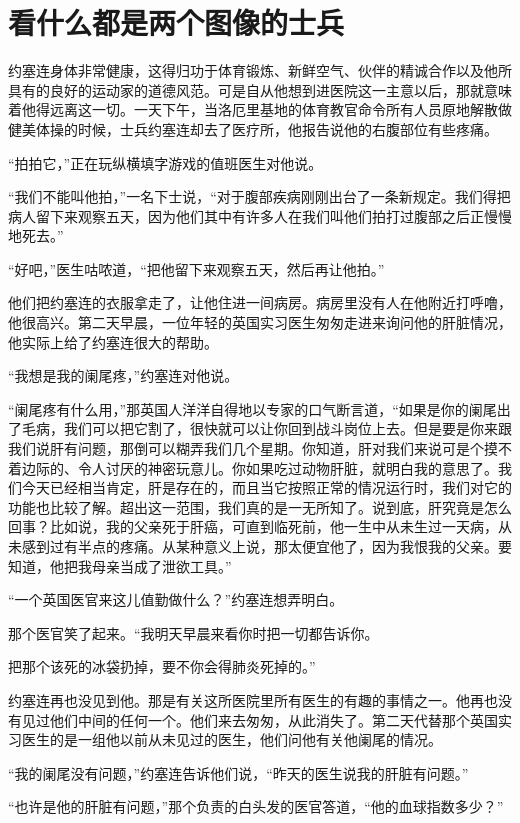 \chapter{看什么都是两个图像的士兵}
 
    约塞连身体非常健康，这得归功于体育锻炼、新鲜空气、伙伴的精诚合作以及他所具有的良好的运动家的道德风范。可是自从他想到进医院这一主意以后，那就意味着他得远离这一切。一天下午，当洛厄里基地的体育教官命令所有人员原地解散做健美体操的时候，士兵约塞连却去了医疗所，他报告说他的右腹部位有些疼痛。

    “拍拍它，”正在玩纵横填字游戏的值班医生对他说。

    “我们不能叫他拍，”一名下士说，“对于腹部疾病刚刚出台了一条新规定。我们得把病人留下来观察五天，因为他们其中有许多人在我们叫他们拍打过腹部之后正慢慢地死去。”

    “好吧，”医生咕哝道，“把他留下来观察五天，然后再让他拍。”

    他们把约塞连的衣服拿走了，让他住进一间病房。病房里没有人在他附近打呼噜，他很高兴。第二天早晨，一位年轻的英国实习医生匆匆走进来询问他的肝脏情况，他实际上给了约塞连很大的帮助。

    “我想是我的阑尾疼，”约塞连对他说。

    “阑尾疼有什么用，”那英国人洋洋自得地以专家的口气断言道，“如果是你的阑尾出了毛病，我们可以把它割了，很快就可以让你回到战斗岗位上去。但是要是你来跟我们说肝有问题，那倒可以糊弄我们几个星期。你知道，肝对我们来说可是个摸不着边际的、令人讨厌的神密玩意儿。你如果吃过动物肝脏，就明白我的意思了。我们今天已经相当肯定，肝是存在的，而且当它按照正常的情况运行时，我们对它的功能也比较了解。超出这一范围，我们真的是一无所知了。说到底，肝究竟是怎么回事？比如说，我的父亲死于肝癌，可直到临死前，他一生中从未生过一天病，从未感到过有半点的疼痛。从某种意义上说，那太便宜他了，因为我恨我的父亲。要知道，他把我母亲当成了泄欲工具。”

    “一个英国医官来这儿值勤做什么？”约塞连想弄明白。

    那个医官笑了起来。“我明天早晨来看你时把一切都告诉你。

    把那个该死的冰袋扔掉，要不你会得肺炎死掉的。”

    约塞连再也没见到他。那是有关这所医院里所有医生的有趣的事情之一。他再也没有见过他们中间的任何一个。他们来去匆匆，从此消失了。第二天代替那个英国实习医生的是一组他以前从未见过的医生，他们问他有关他阑尾的情况。

    “我的阑尾没有问题，”约塞连告诉他们说，“昨天的医生说我的肝脏有问题。”

    “也许是他的肝脏有问题，”那个负责的白头发的医官答道，“他的血球指数多少？”

